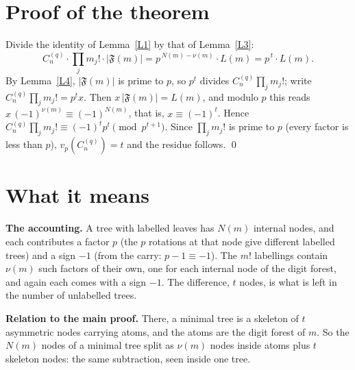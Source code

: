 \documentclass[11pt]{article}
\theoremstyle{remark}
\newcommand{\F}{\mathfrak F}
\newcommand{\C}{C_n^{(q)}}
\begin{document}
\section{Proof of the theorem}

Divide the identity of Lemma~\ref{L1} by that of Lemma~\ref{L3}:
\[
 \C\cdot\prod_jm_j!\cdot|\F(m)|=p^{\,N(m)-\nu(m)}\cdot L(m)=p^{\,t}\cdot L(m).
\]
By Lemma~\ref{L4}, $|\F(m)|$ is prime to $p$, so $p^t$ divides $\C\prod_jm_j!$; write
$\C\prod_jm_j!=p^tx$. Then $x\,|\F(m)|=L(m)$, and modulo $p$ this reads
$x\,(-1)^{\nu(m)}\equiv(-1)^{N(m)}$, that is, $x\equiv(-1)^t$. Hence
$\C\prod_jm_j!\equiv(-1)^tp^t\pmod{p^{t+1}}$. Since $\prod_jm_j!$ is prime to $p$ (every factor
is less than $p$), $v_p(\C)=t$ and the residue follows. \qed

\section{What it means}

\textbf{The accounting.} A tree with labelled leaves has $N(m)$ internal nodes, and each
contributes a factor $p$ (the $p$ rotations at that node give different labelled trees) and a
sign $-1$ (from the carry: $p-1\equiv-1$). The $m!$ labellings contain $\nu(m)$ such factors
of their own, one for each internal node of the digit forest, and again each comes with a
sign $-1$. The difference, $t$ nodes, is what is left in the number of unlabelled trees.

\textbf{Relation to the main proof.} There, a minimal tree is a skeleton of $t$ asymmetric
nodes carrying atoms, and the atoms are the digit forest of $m$. So the $N(m)$ nodes of a
minimal tree split as $\nu(m)$ nodes inside atoms plus $t$ skeleton nodes: the same
subtraction, seen inside one tree.
\end{document}
